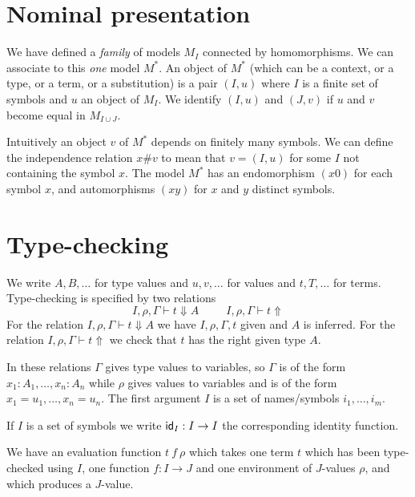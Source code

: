 \documentclass[10pt,a4paper]{article}
\newcommand{\ID}{{\sf id}}
\begin{document}
\section{Nominal presentation}

 We have defined a {\em family} of models $M_I$ connected by homomorphisms.
We can associate to this {\em one} model $M^*$. An object of $M^*$ (which can
be a context, or a type, or a term, or a substitution) is a pair $(I,u)$
where $I$ is a finite set of symbols and $u$ an object of $M_I$. We identify
$(I,u)$ and $(J,v)$ if $u$ and $v$ become equal in $M_{I\cup J}$.

\medskip

 Intuitively an object $v$ of $M^*$ depends on finitely many symbols. We can 
define the independence relation $x\#v$ to mean that $v = (I,u)$ for some $I$
not containing the symbol $x$.
The model $M^*$ has an endomorphism $(x0)$ for each symbol $x$, and automorphisms
$(xy)$ for $x$ and $y$ distinct symbols.

\section{Type-checking}

 We write $A,B,\dots$ for type values and $u,v,\dots$ for values and $t,T,\dots$ for terms.
Type-checking is specified by two relations
$$
I,\rho,\Gamma\vdash t\Downarrow A~~~~~~~~~~~I,\rho,\Gamma\vdash t\Uparrow
$$
For the relation $I,\rho,\Gamma\vdash t\Downarrow A$ we have $I,\rho,\Gamma,t$ given and
$A$ is inferred. For the relation $I,\rho,\Gamma\vdash t\Uparrow$ we check that $t$ has
the right given type $A$.

 In these relations $\Gamma$ gives type values to variables, so $\Gamma$ is of the form
$x_1:A_1,\dots,x_n:A_n$ while $\rho$ gives values to variables and is of the form
$x_1 = u_1,\dots,x_n=u_n$. The first argument $I$ is a set of names/symbols
$i_1,\dots,i_m$. 

 If $I$ is a set of symbols we write $\ID_I:I\rightarrow I$ the corresponding identity function.

 We have an evaluation function $t~f~\rho$ which takes one term $t$ which has been type-checked
using $I$, one function $f:I\rightarrow J$ and one environment of $J$-values $\rho$, and which produces
a $J$-value.
\end{document}
